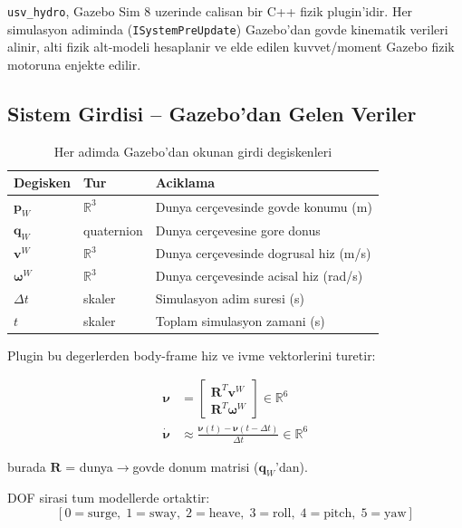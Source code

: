 \documentclass[12pt,a4paper]{article}
\newcommand{\nuvec}{\boldsymbol{\nu}}
\newcommand{\nudot}{\dot{\boldsymbol{\nu}}}
\begin{document}
\texttt{usv\_hydro}, Gazebo Sim 8 uzerinde calisan bir C++ fizik
plugin'idir. Her simulasyon adiminda (\texttt{ISystemPreUpdate}) Gazebo'dan
govde kinematik verileri alinir, alti fizik alt-modeli hesaplanir ve elde
edilen kuvvet/moment Gazebo fizik motoruna enjekte edilir.

\subsection{Sistem Girdisi -- Gazebo'dan Gelen Veriler}

\begin{table}[H]
  \centering
  \caption{Her adimda Gazebo'dan okunan girdi degiskenleri}
  \begin{tabularx}{\linewidth}{llX}
    \toprule
    \textbf{Degisken} & \textbf{Tur} & \textbf{Aciklama} \\
    \midrule
    $\mathbf{p}_W$ & $\mathbb{R}^3$ & Dunya cerçevesinde govde konumu (m) \\
    $\mathbf{q}_W$ & quaternion & Dunya cerçevesine gore donus \\
    $\mathbf{v}^W$ & $\mathbb{R}^3$ & Dunya cerçevesinde dogrusal hiz (m/s) \\
    $\boldsymbol{\omega}^W$ & $\mathbb{R}^3$ & Dunya cerçevesinde acisal hiz (rad/s) \\
    $\Delta t$ & skaler & Simulasyon adim suresi (s) \\
    $t$ & skaler & Toplam simulasyon zamani (s) \\
    \bottomrule
  \end{tabularx}
\end{table}

Plugin bu degerlerden body-frame hiz ve ivme vektorlerini turetir:

\begin{align}
  \nuvec &= \begin{bmatrix}
    \mathbf{R}^T \mathbf{v}^W \\[2pt]
    \mathbf{R}^T \boldsymbol{\omega}^W
  \end{bmatrix} \in \mathbb{R}^6
  \label{eq:body_vel} \\[6pt]
  \nudot &\approx \frac{\nuvec(t) - \nuvec(t-\Delta t)}{\Delta t} \in \mathbb{R}^6
  \label{eq:body_accel}
\end{align}

burada $\mathbf{R}$ = dunya$\to$govde donum matrisi ($\mathbf{q}_W$'dan).

\medskip
DOF sirasi tum modellerde ortaktir:
\[
  [0{=}\text{surge},\;
   1{=}\text{sway},\;
   2{=}\text{heave},\;
   3{=}\text{roll},\;
   4{=}\text{pitch},\;
   5{=}\text{yaw}]
\]
\end{document}
